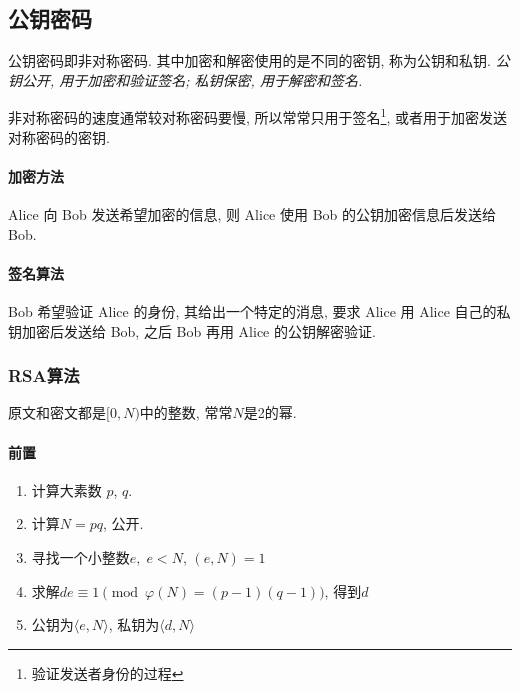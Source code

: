 \documentclass{ctexart}
\begin{document}


\clearpage
\subsection{公钥密码}
    公钥密码即非对称密码. 
    其中加密和解密使用的是不同的密钥, 称为公钥和私钥.
    \emph{公钥公开, 用于加密和验证签名; 私钥保密, 用于解密和签名.}\par
    非对称密码的速度通常较对称密码要慢,
    所以常常只用于签名\footnote{验证发送者身份的过程},
    或者用于加密发送对称密码的密钥.
\paragraph{加密方法} Alice 向 Bob 发送希望加密的信息, 则 Alice 使用 Bob 的公钥加密信息后发送给 Bob.
\paragraph{签名算法} Bob 希望验证 Alice 的身份, 
    其给出一个特定的消息, 要求 Alice 用 Alice 自己的私钥加密后发送给 Bob,
    之后 Bob 再用 Alice 的公钥解密验证.
\subsubsection{RSA算法}
    原文和密文都是$[0, N)$中的整数, 常常$N$是2的幂.\par
\paragraph{前置}
    \begin{enumerate}
        \item 计算大素数 $p$, $q$.
        \item 计算$N = pq$, 公开.
        \item 寻找一个小整数$e,\;e < N,\,(e, N) = 1$
        \item 求解$d e \equiv 1 \pmod{\varphi(N) = (p-1)(q-1)}$, 得到$d$
        \item 公钥为$\langle e, N \rangle$, 私钥为$\langle d, N \rangle$
    \end{enumerate}
\end{document}
